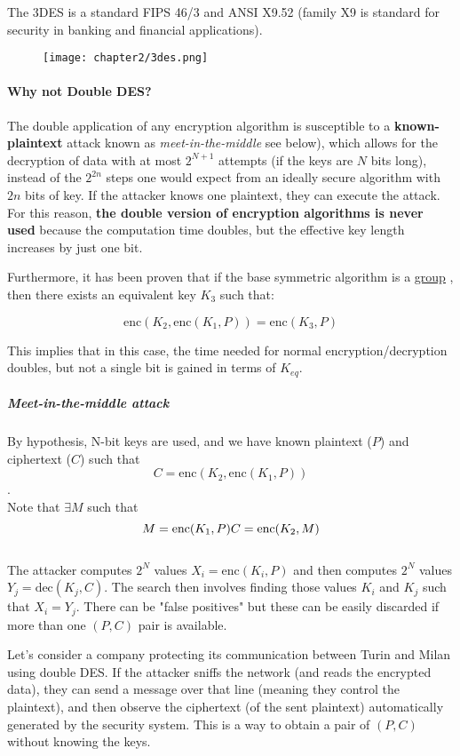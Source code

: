The 3DES is a standard FIPS 46/3 and ANSI X9.52 (family X9 is standard for security in banking and financial
applications).

\begin{figure}[h]
    \centering
    \texttt{[image: chapter2/3des.png]}
\end{figure}

\paragraph*{Why not Double DES?}
The double application of any encryption algorithm is susceptible to a \textbf{known-plaintext} attack known as \textit{meet-in-the-middle} see below), which allows for the decryption of data with at most \(2^{N+1}\) attempts (if the keys are \(N\) bits long), instead of the $2^{2n}$ steps one would expect from an ideally secure algorithm with $2n$ bits of key.
If the attacker knows one plaintext, they can execute the attack. For this reason, \textbf{the double version of encryption algorithms is never used} because the computation time doubles, but the effective key length increases by just one bit.

Furthermore, it has been proven that if the base symmetric algorithm is a \href{https://en.wikipedia.org/wiki/Group_(mathematics)}{\underline{group}} , then there exists an equivalent key \(K_3\) such that:

\[
    \text{enc}(K_2, \text{enc}(K_1, P)) = \text{enc}(K_3, P)
\]

This implies that in this case, the time needed for normal encryption/decryption doubles, but not a single bit is gained in terms of \(K_{eq}\).


\subparagraph*{Meet-in-the-middle attack}\label{meetinthemiddle}
By hypothesis, N-bit keys are used, and we have known plaintext (\(P\)) and ciphertext (\(C\)) such that 
\[C = \text{enc}(K_2, \text{enc}(K_1, P))\]. \\
Note that \(\exists M\) such that  
\[
    M = \text{enc}(K_1, P)\\
    C = \text{enc}(K_2, M)
\]
\\
The attacker computes \(2^N\) values \(X_i = \text{enc}(K_i, P)\) and then computes \(2^N\) values \(Y_j = \text{dec}(K_j, C)\).
The search then involves finding those values \(K_i\) and \(K_j\) such that \(X_i = Y_j\).
There can be "false positives" but these can be easily discarded if more than one \((P, C)\) pair is available.

Let's consider a company protecting its communication between Turin and Milan using double DES. If the attacker sniffs the network (and reads the encrypted data), they can send a message over that line (meaning they control the plaintext), and then observe the ciphertext (of the sent plaintext) automatically generated by the security system.
This is a way to obtain a pair of \((P, C)\) without knowing the keys.


